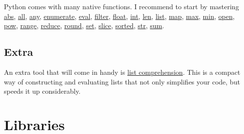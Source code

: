 \documentclass[11pt]{article}
\begin{document}
Python comes with many native functions. I recommend to start by mastering \href{https://docs.python.org/2/library/functions.html#abs}{abs}, \href{https://docs.python.org/2/library/functions.html#all}{all}, \href{https://docs.python.org/2/library/functions.html#any}{any}, \href{https://docs.python.org/2/library/functions.html#enumerate}{enumerate}, \href{https://docs.python.org/2/library/functions.html#eval}{eval}, \href{https://docs.python.org/2/library/functions.html#filter}{filter}, \href{https://docs.python.org/2/library/functions.html#float}{float}, \href{https://docs.python.org/2/library/functions.html#int}{int}, \href{https://docs.python.org/2/library/functions.html#len}{len}, \href{https://docs.python.org/2/library/functions.html#list}{list}, \href{https://docs.python.org/2/library/functions.html#map}{map}, \href{https://docs.python.org/2/library/functions.html#max}{max}, \href{https://docs.python.org/2/library/functions.html#min}{min}, \href{https://docs.python.org/2/library/functions.html#open}{open}, \href{https://docs.python.org/2/library/functions.html#pow}{pow}, \href{https://docs.python.org/2/library/functions.html#range}{range}, \href{https://docs.python.org/2/library/functions.html#reduce}{reduce}, \href{https://docs.python.org/2/library/functions.html#round}{round}, \href{https://docs.python.org/2/library/functions.html#func-set}{set}, \href{https://docs.python.org/2/library/functions.html#slice}{slice}, \href{https://docs.python.org/2/library/functions.html#sorted}{sorted}, \href{https://docs.python.org/2/library/functions.html#sorted}{str},
\href{https://docs.python.org/2/library/functions.html#sum}{sum}.



\subsection{Extra}

An extra tool that will come in handy is \href{https://docs.python.org/2/tutorial/datastructures.html#list-comprehensions}{list comprehension}. This is a compact way of constructing and evaluating lists that not only simplifies your code, but speeds it up considerably.







\section{Libraries}
\end{document}
